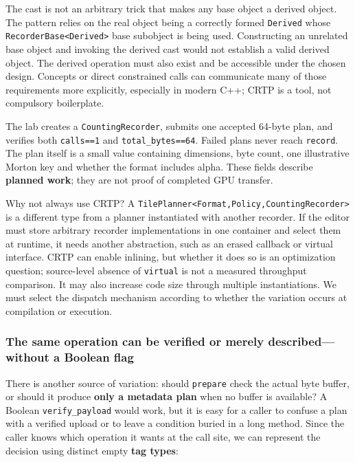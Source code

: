 The cast is not an arbitrary trick that makes any base object a derived object. The pattern relies on the real object being a correctly formed \texttt{Derived} whose \texttt{RecorderBase\textless{}Derived\textgreater{}} base subobject is being used. Constructing an unrelated base object and invoking the derived cast would not establish a valid derived object. The derived operation must also exist and be accessible under the chosen design. Concepts or direct constrained calls can communicate many of those requirements more explicitly, especially in modern C++; CRTP is a tool, not compulsory boilerplate.

The lab creates a \texttt{CountingRecorder}, submits one accepted 64-byte plan, and verifies both \texttt{calls==1} and \texttt{total\_bytes==64}. Failed plans never reach \texttt{record}. The plan itself is a small value containing dimensions, byte count, one illustrative Morton key and whether the format includes alpha. These fields describe \textbf{planned work}; they are not proof of completed GPU transfer.

Why not always use CRTP? A \texttt{TilePlanner\textless{}Format,Policy,CountingRecorder\textgreater{}} is a different type from a planner instantiated with another recorder. If the editor must store arbitrary recorder implementations in one container and select them at runtime, it needs another abstraction, such as an erased callback or virtual interface. CRTP can enable inlining, but whether it does so is an optimization question; source-level absence of \texttt{virtual} is not a measured throughput comparison. It may also increase code size through multiple instantiations. We must select the dispatch mechanism according to whether the variation occurs at compilation or execution.

\subsubsection{The same operation can be verified or merely described---without a Boolean flag}\label{the-same-operation-can-be-verified-or-merely-describedwithout-a-boolean-flag}

There is another source of variation: should \texttt{prepare} check the actual byte buffer, or should it produce \textbf{only a metadata plan} when no buffer is available? A Boolean \texttt{verify\_payload} would work, but it is easy for a caller to confuse a plan with a verified upload or to leave a condition buried in a long method. Since the caller knows which operation it wants at the call site, we can represent the decision using distinct empty \textbf{tag types}:

